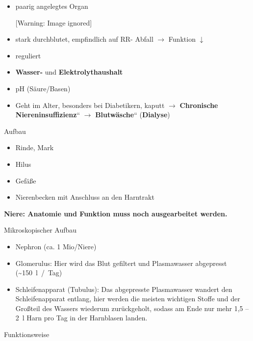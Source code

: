 \documentclass{article}
\newcommand\gEs[1]{\textbf{\textcolor[rgb]{0.0,0.0,0.5019608}{#1}}}
\newcommand\gEs[1]{\textbf{\textcolor[rgb]{0.0,0.0,0.5019608}{#1}}}
\newcommand\gT[1]{\textbf{\textup{\textcolor[rgb]{0.0,0.5019608,0.0}{#1}}}}
\newcommand\gZ[1]{\textcolor[rgb]{0.5019608,0.5019608,0.5019608}{#1}}
\begin{document}
\begin{itemize}
\item {\mdseries
paarig angelegtes Organ}

\begin{center}
 [Warning: Image ignored] %

\end{center}
\item {\mdseries
stark durchblutet, empfindlich auf RR- Abfall ${\rightarrow}$ Funktion
${\downarrow}$ }

\item {\mdseries
reguliert}

\end{itemize}
\begin{itemize}
\item {\mdseries
\gEs{Wasser-} und
\gEs{Elektrolythaushalt}}

\item {\mdseries
pH (S\"aure/Basen)}

\end{itemize}
\begin{itemize}
\item {\mdseries
Geht im Alter, besonders bei Diabetikern, kaputt ${\rightarrow}$
{\quotedblbase}\gEs{Chronische
Niereninsuffizienz}{\textquotedblleft} ${\rightarrow}$
{\quotedblbase}\gEs{Blutw\"asche}{\textquotedblleft}
(\gT{Dialyse})}

\end{itemize}
{\mdseries\color{black}
Aufbau}

\begin{itemize}
\item {\mdseries
Rinde, Mark}

\item {\mdseries
Hilus}

\item {\mdseries
Gef\"a{\ss}e}

\item {\mdseries
Nierenbecken mit Anschluss an den Harntrakt}

\end{itemize}
{\bfseries\color[rgb]{0.5019608,0.0,0.0}
Niere: Anatomie und Funktion muss noch ausgearbeitet werden.}

{\mdseries\color{black}
%
%
Mikroskopischer Aufbau}

\begin{itemize}
\item {\mdseries
Nephron (ca. 1 Mio/Niere)}

\item {\mdseries
Glomerulus: Hier wird das Blut gefiltert und Plasmawasser abgepresst
(\~{}150~l~/~Tag)}

\item {\mdseries
Schleifenapparat \gZ{(Tubulus)}: Das abgepresste
Plasma\-wasser wandert den Schleifen\-apparat entlang, hier werden die
meisten wichtigen Stoffe und der Gro{\ss}\-teil des Wassers wiederum
zur\"uckgeholt, sodass am Ende nur mehr 1,5 -- 2~l Harn pro Tag in der
Harnblasen landen. }

\end{itemize}
{\mdseries\color{black}
Funktionsweise}
\end{document}

